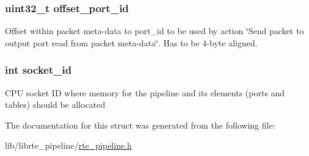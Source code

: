 \subsubsection[{offset\+\_\+port\+\_\+id}]{\setlength{\rightskip}{0pt plus 5cm}uint32\+\_\+t offset\+\_\+port\+\_\+id}\label{structrte__pipeline__params_a25c4a20cf2bedc19add239e11f1f461f}
Offset within packet meta-\/data to port\+\_\+id to be used by action \char`\"{}\+Send packet to output port read from packet meta-\/data\char`\"{}. Has to be 4-\/byte aligned. \hypertarget{structrte__pipeline__params_a229cb0bd24215f0cb940e0724dbd4d55}{}
\subsubsection[{socket\+\_\+id}]{\setlength{\rightskip}{0pt plus 5cm}int socket\+\_\+id}\label{structrte__pipeline__params_a229cb0bd24215f0cb940e0724dbd4d55}
C\+P\+U socket I\+D where memory for the pipeline and its elements (ports and tables) should be allocated 

The documentation for this struct was generated from the following file\+:\begin{DoxyCompactItemize}
\item 
lib/librte\+\_\+pipeline/\hyperlink{rte__pipeline_8h}{rte\+\_\+pipeline.\+h}\end{DoxyCompactItemize}
